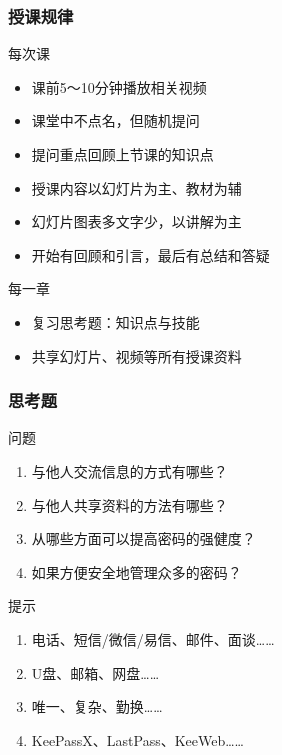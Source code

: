 \begin{frame}
  \frametitle{授课规律}
  \begin{block}{每次课}
    \begin{itemize}
      \item 课前5～10分钟播放相关视频
      \item 课堂中不点名，但随机提问
      \item 提问重点回顾上节课的知识点
      \item 授课内容以幻灯片为主、教材为辅
      \item 幻灯片图表多文字少，以讲解为主
      \item 开始有回顾和引言，最后有总结和答疑
    \end{itemize}
  \end{block}
  \pause
  \begin{block}{每一章}
    \begin{itemize}
      \item 复习思考题：知识点与技能
      \item 共享幻灯片、视频等所有授课资料
    \end{itemize}
  \end{block}
\end{frame}

\begin{frame}
  \frametitle{思考题}
  \begin{block}{问题}
  \begin{enumerate}[<+->]
    \item 与他人交流信息的方式有哪些？
    \item 与他人共享资料的方法有哪些？
    \item 从哪些方面可以提高密码的强健度？
    \item 如果方便安全地管理众多的密码？
  \end{enumerate}
  \end{block}
  \pause
  \begin{block}{提示}
    \begin{enumerate}
      \item 电话、短信/微信/易信、邮件、面谈……
      \item U盘、邮箱、网盘……
      \item 唯一、复杂、勤换……
      \item KeePassX、LastPass、KeeWeb……
    \end{enumerate}
  \end{block}
\end{frame}
